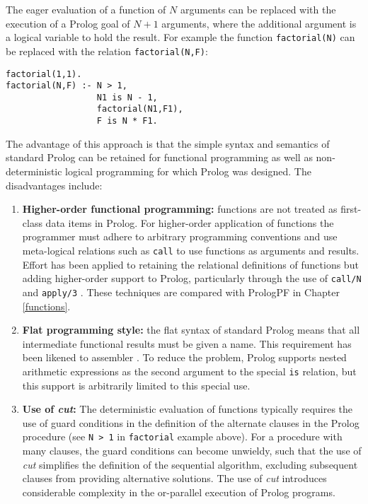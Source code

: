 The eager evaluation of a function of $N$ arguments can be replaced with the
execution of a Prolog goal of $N+1$ arguments,
where the additional argument is a logical variable to hold the
result.  For example the function \texttt{factorial(N)} can be
replaced with the relation \texttt{factorial(N,F)}:
\begin{verbatim}
factorial(1,1).
factorial(N,F) :- N > 1,
                  N1 is N - 1,
                  factorial(N1,F1),
                  F is N * F1.
\end{verbatim}
The advantage of this approach is that the simple syntax and semantics of standard
Prolog can be retained for functional programming as well as non-deterministic logical
programming for which Prolog was designed.  The disadvantages include:
\begin{enumerate}
\item{\textbf{Higher-order functional programming:}  functions are not treated as
  first-class data items in Prolog.  For higher-order application of functions the
  programmer must adhere to arbitrary programming conventions and use meta-logical
  relations such as \texttt{call} to use functions as arguments and results.  Effort
  has been applied to retaining the relational definitions of functions but adding
  higher-order support to Prolog, particularly through the use of \texttt{call/N}
  \cite{SHC95,Nai96} and \texttt{apply/3} \cite{Nai96}.  These techniques are
  compared with PrologPF in Chapter \ref{functions}.}
\item{\textbf{Flat programming style:} the flat syntax of standard Prolog means that
  all intermediate functional results must be given a name.  This requirement has
  been likened to assembler \cite{App92}.  To reduce the problem, Prolog supports
  nested arithmetic expressions as the second argument to the special \texttt{is}
  relation, but this support is arbitrarily limited to this special use.}
\item{\textbf{Use of \textit{cut}:} The deterministic evaluation of functions typically
  requires the use of guard conditions in the definition of the alternate clauses in the
  Prolog procedure (see \texttt{N > 1} in \texttt{factorial} example above).  For a
  procedure with many clauses, the guard conditions can become unwieldy, such that the
  use of \textit{cut} simplifies the definition of the sequential algorithm, excluding
  subsequent clauses from providing alternative solutions.  The use of \textit{cut}
  introduces considerable complexity in the or-parallel execution of Prolog programs.
}
\end{enumerate}
